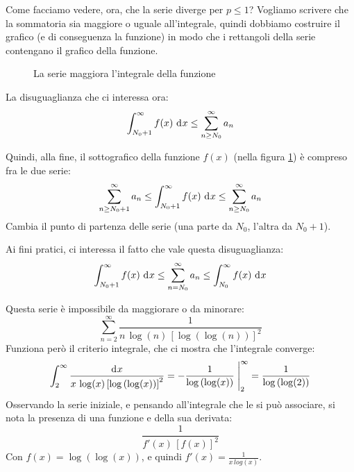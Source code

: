 Come facciamo vedere, ora, che la serie diverge per $p \le 1$? Vogliamo scrivere che la sommatoria sia maggiore o uguale all'integrale, quindi dobbiamo costruire il grafico (e di conseguenza la funzione) in modo che i rettangoli della serie contengano il grafico della funzione.

\begin{figure}
\centering
{}
\caption{\label{fig:serie_maggiora_integrale}La serie maggiora l'integrale della funzione}
\end{figure}

La disuguaglianza che ci interessa ora:
\[
\int_{N_0 + 1}^{\infty} f(x) \dx \le \sum_{n \ge N_0}^{\infty} a_n 
\]

Quindi, alla fine, il sottografico della funzione $f(x)$ (nella figura \ref{fig:serie_maggiora_integrale}) \`e compreso fra le due serie:
\[
\sum_{n \ge N_0 + 1}^{\infty} a_n \le
\int_{N_0 + 1}^{\infty} f(x) \dx \le 
\sum_{n \ge N_0}^{\infty} a_n 
\]
Cambia il punto di partenza delle serie (una parte da $N_0$, l'altra da $N_0 + 1$).

Ai fini pratici, ci interessa il fatto che vale questa disuguaglianza:
\[
\int_{N_0 + 1}^{\infty} f(x) \dx \le 
\sum_{n = N_0}^{\infty} a_n \le
\int_{N_0}^{\infty} f(x) \dx
\]

\begin{exmp}
Questa serie \`e impossibile da maggiorare o da minorare:
\[
\sum_{n = 2}^{\infty} \frac{1}{n \, \log (n) \, {\left[ \log \left( \log (n) \right) \right]}^{2}}
\]
Funziona per\`o il criterio integrale, che ci mostra che l'integrale converge:
\[
\int_{2}^{\infty} \frac{\diff x}{x \, \log(x) \, {\left[ \log \left( \log (x) \right) \right]}^{2}} = \increment{- \frac{1}{\log \left( \log(x) \right)}}^{\infty}_{2} = \frac{1}{\log \left( \log(2) \right)}
\]
Osservando la serie iniziale, e pensando all'integrale che le si pu\`o associare, si nota la presenza di una funzione e della sua derivata:
\[
\frac{1}{f'(x) \, {\left[ f(x) \right]}^2}
\]
Con $f(x) = \log \left( \log(x) \right)$, e quindi $f'(x) = \frac{1}{x \, log \left( x \right)}$.
\end{exmp}

